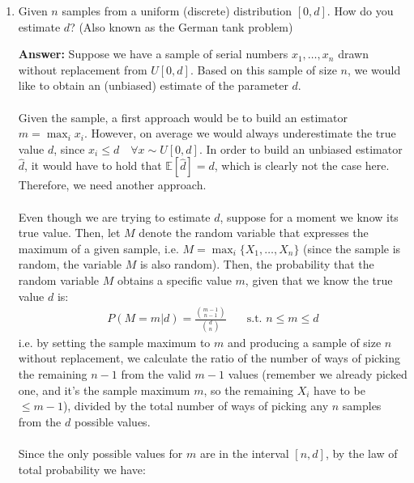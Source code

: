 \documentclass{article}
\newenvironment{QandA}{\begin{enumerate}[label=\arabic*.]}{\end{enumerate}}
\newenvironment{answer}{\par\normalfont \textbf{Answer:}}{}
\newcommand{\Exp}[1]{\mathbb{E}\left[ #1 \right]}
\newcommand{\g}{\vert}
\begin{document}
\begin{QandA}
\begin{answer}
        (Read more \href{https://www.glassdoor.com/Interview/You-re-about-to-get-on-a-plane-to-Seattle-You-want-to-know-if-you-should-bring-an-umbrella-You-call-3-random-friends-of-y-QTN_519262.htm}{here})
    \end{answer}

    \item Given $n$ samples from a uniform (discrete) distribution $\left[0, d\right]$. How do you estimate $d$? (Also known as the German tank problem)
    \begin{answer}
        Suppose we have a sample of serial numbers $x_1, \ldots, x_n$ drawn without replacement from $U[0, d]$. Based on this sample of size $n$, we would like to obtain an (unbiased) estimate of the parameter $d$. \\\\
        Given the sample, a first approach would be to build an estimator $m = \max_i x_i$. However, on average we would always underestimate the true value $d$, since $x_i \le d \quad  \forall x \sim U[0, d]$. In order to build an unbiased estimator $\hat{d}$, it would have to hold that $\Exp{\hat{d}} = d$, which is clearly not the case here. Therefore, we need another approach. \\\\
        Even though we are trying to estimate $d$, suppose for a moment we know its true value. Then, let $M$ denote the random variable that expresses the maximum of a given sample, i.e. $M = \max_i \{X_1, \ldots, X_n\}$ (since the sample is random, the variable $M$ is also random). Then, the probability that the random variable $M$ obtains a specific value $m$, given that we know the true value $d$ is:
        \begin{align*}
            P(M = m \g d) = \frac{{ m-1 \choose n-1}}{{ d \choose n }} &\quad \text{s.t. } n \le m \le d
        \end{align*}
        i.e. by setting the sample maximum to $m$ and producing a sample of size $n$ without replacement, we calculate the ratio of the number of ways of picking the remaining $n-1$ from the valid $m-1$ values (remember we already picked one, and it's the sample maximum $m$, so the remaining $X_i$ have to be $\le m-1$), divided by the total number of ways of picking any $n$ samples from the $d$ possible values.\\\\
        Since the only possible values for $m$ are in the interval $[n, d]$, by the law of total probability we have:
        \begin{align*}

\end{align*}
\end{answer}
\end{QandA}
\end{document}
